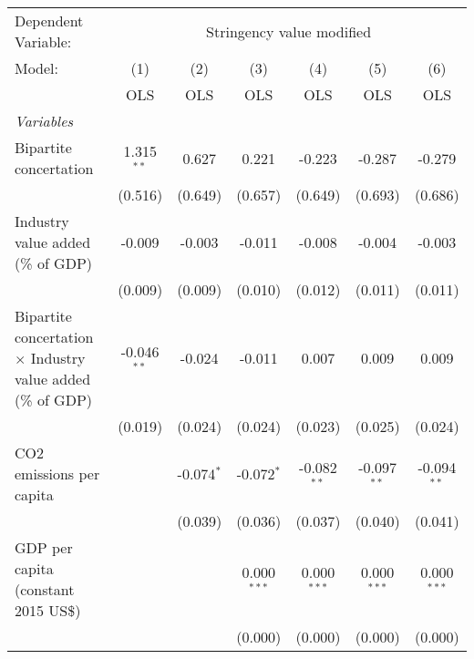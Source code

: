 
\begingroup
\centering
\begin{tabular}{lcccccc}
   \toprule
   Dependent Variable: & \multicolumn{6}{c}{Stringency value modified}\\
   Model:                                                             & (1)           & (2)          & (3)           & (4)            & (5)            & (6)\\  
                                                                      &  OLS          & OLS          & OLS           & OLS            & OLS            & OLS\\  
   \midrule
   \emph{Variables}\\
   Bipartite concertation                                             & 1.315$^{**}$  & 0.627        & 0.221         & -0.223         & -0.287         & -0.279\\   
                                                                      & (0.516)       & (0.649)      & (0.657)       & (0.649)        & (0.693)        & (0.686)\\   
   Industry value added (\% of GDP)                                   & -0.009        & -0.003       & -0.011        & -0.008         & -0.004         & -0.003\\   
                                                                      & (0.009)       & (0.009)      & (0.010)       & (0.012)        & (0.011)        & (0.011)\\   
   Bipartite concertation $\times$ Industry value added (\% of GDP)   & -0.046$^{**}$ & -0.024       & -0.011        & 0.007          & 0.009          & 0.009\\   
                                                                      & (0.019)       & (0.024)      & (0.024)       & (0.023)        & (0.025)        & (0.024)\\   
   CO2 emissions per capita                                           &               & -0.074$^{*}$ & -0.072$^{*}$  & -0.082$^{**}$  & -0.097$^{**}$  & -0.094$^{**}$\\   
                                                                      &               & (0.039)      & (0.036)       & (0.037)        & (0.040)        & (0.041)\\   
   GDP per capita (constant 2015 US\$)                                &               &              & 0.000$^{***}$ & 0.000$^{***}$  & 0.000$^{***}$  & 0.000$^{***}$\\   
                                                                      &               &              & (0.000)       & (0.000)        & (0.000)        & (0.000)\\   

\end{tabular}

